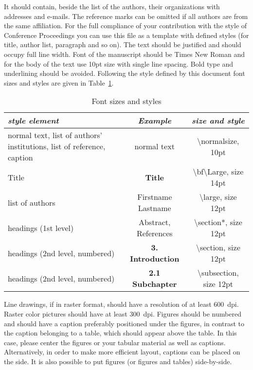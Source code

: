 \documentclass{mbd_fullpaper}
\begin{document}
It should contain, beside the list of the authors, their organizations with addresses and e-mails. The reference marks can be omitted if all authors are from the same affiliation.
For the full compliance of your contribution with the style of Conference Proceedings you can use this file as a template with defined styles (for title, author list, paragraph and so on). The text should be justified and should occupy full line width. Font of the manuscript should be Times New Roman and for the body of the text use 10pt size with single line spacing. Bold type and underlining should be avoided. Following the style defined by this document font sizes and styles are given in Table~\ref{tab:tab1}.

\renewcommand{\arraystretch}{1.5}

\begin{table}[!ht]
  \begin{center}
    \caption{Font sizes and styles}
    \vspace{1mm}
    \begin{tabular}{|p{5cm}|c|c|}
      \hline
        {\it style element}&	{\it Example}&	{\it size and style}\\
      \hline
      \hline
        normal text, list of authors' institutions, list of reference, caption &	normal text&	\textbackslash normalsize, 10pt\\
      \hline
        Title&	{\bf\Large Title}&	\textbackslash bf\textbackslash Large, size 14pt\\
      \hline
        list of authors&	{\large Firstname Lastname}&	\textbackslash large, size 12pt\\
      \hline
        headings (1st level)& {\large	Abstract, References}&	 \textbackslash section*, size 12pt\\
      \hline
        headings (2nd level, numbered)&	{\bf\large 3. Introduction}&	\textbackslash section, size 12pt\\
      \hline
        headings (2nd level, numbered)& {\bf\large 2.1 Subchapter}&	\textbackslash subsection, size 12pt\\
      \hline
    \end{tabular}
    \label{tab:tab1}
  \end{center}
\end{table}

Line drawings, if in raster format, should have a resolution of at least 600~dpi. Raster color pictures should have at least 300~dpi. Figures should be numbered and should have a caption preferably positioned under the figures, in contrast to the caption belonging to a table, which should appear above the table. In this case, please center the figures or your tabular material as well as captions. Alternatively, in order to make more efficient layout, captions can be placed on the side. It is also possible to put figures (or figures and tables) side-by-side.
\end{document}
